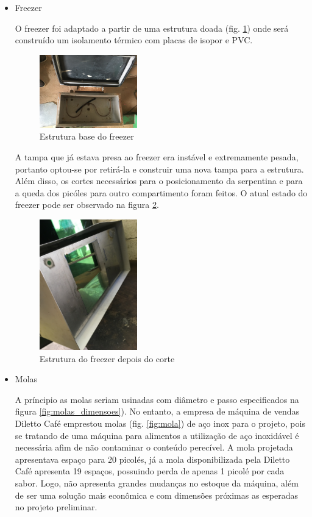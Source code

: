 \begin{itemize}
\item Freezer

O freezer foi adaptado a partir de uma estrutura doada (fig. \ref{fig:freezer}) onde será construído um isolamento térmico com placas de isopor e PVC.


   \begin{figure}[H]
	\centering
    \includegraphics[width=0.4\textwidth]{figuras/freezer}
    \caption{Estrutura base do freezer}
    \label{fig:freezer}
\end{figure}

A tampa que já estava presa ao freezer era instável e extremamente pesada, portanto optou-se por retirá-la e construir uma nova tampa para a estrutura. Além disso, os cortes necessários para o posicionamento da serpentina e para a queda dos picóles para outro compartimento foram feitos. O atual estado do freezer pode ser observado na figura \ref{fig:freezer_cortado}.

   \begin{figure}[H]
	\centering
   \includegraphics[width=0.4\textwidth]{figuras/freezer_cortado}
    \caption{Estrutura do freezer depois do corte}
    \label{fig:freezer_cortado}
	\end{figure}

\item Molas

A príncipio as molas seriam usinadas com diâmetro e passo especificados na figura \ref{fig:molas_dimensoes}). No entanto, a empresa de máquina de vendas Diletto Café emprestou molas (fig. \ref{fig:mola}) de aço inox  para o projeto, pois se tratando de uma máquina para alimentos a utilização de aço inoxidável é necessária afim de não contaminar o conteúdo perecível. A mola projetada apresentava espaço para 20 picolés, já a mola disponibilizada pela Diletto Café apresenta 19 espaços, possuindo perda de apenas 1 picolé por cada sabor. Logo, não apresenta grandes mudanças no estoque da máquina, além de ser uma solução mais econômica e com dimensões próximas as esperadas no projeto preliminar.


\end{itemize}
